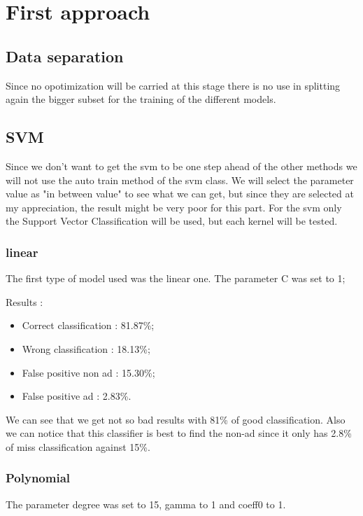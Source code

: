 \chapter{First approach}

\section{Data separation}

Since no opotimization will be carried at this stage there is no use in splitting again the bigger subset for the training of the different models.

\section{SVM}

Since we don't want to get the svm to be one step ahead of the other methods we will not use the auto train method of the svm class. We will select the parameter value as "in between value" to see what we can get, but since they are selected at my appreciation, the result might be very poor for this part.
For the svm only the Support Vector Classification will be used, but each kernel will be tested.


\subsection{linear}

The first type of model used was the linear one. The parameter C was set to 1;

Results :
\begin{itemize}
  \item Correct classification : 81.87\%;
  \item Wrong classification : 18.13\%;
  \item False positive non ad : 15.30\%;
  \item False positive ad : 2.83\%.
\end{itemize}

We can see that we get not so bad results with 81\% of good classification. Also we can notice that this classifier is best to find the non-ad since it only has 2.8\% of miss classification against 15\%.

\subsection{Polynomial}
The parameter degree was set to 15, gamma to 1 and coeff0 to 1.

